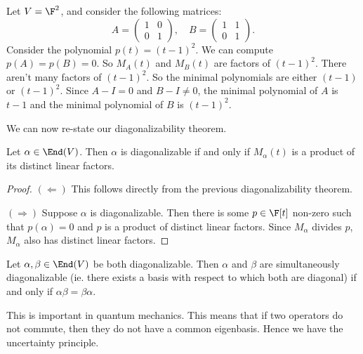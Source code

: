 \documentclass[a4paper]{article}
\begin{document}
\begin{eg}
  Let $V = \F^2$, and consider the following matrices:
  \[
    A =
    \begin{pmatrix}
      1 & 0\\
      0 & 1
    \end{pmatrix},\quad
    B =
    \begin{pmatrix}
      1 & 1\\
      0 & 1
    \end{pmatrix}.
  \]
  Consider the polynomial $p(t) = (t - 1)^2$. We can compute $p(A) = p(B) = 0$. So $M_A(t)$ and $M_B(t)$ are factors of $(t - 1)^2$. There aren't many factors of $(t - 1)^2$. So the minimal polynomials are either $(t - 1)$ or $(t - 1)^2$. Since $A - I = 0$ and $B - I \not= 0$, the minimal polynomial of $A$ is $t - 1$ and the minimal polynomial of $B$ is $(t - 1)^2$.
\end{eg}

We can now re-state our diagonalizability theorem.
\begin{thm}
  Let $\alpha \in \End(V)$. Then $\alpha$ is diagonalizable if and only if $M_\alpha(t)$ is a product of its distinct linear factors.
\end{thm}

\begin{proof}
  $(\Leftarrow)$ This follows directly from the previous diagonalizability theorem.

  $(\Rightarrow)$ Suppose $\alpha$ is diagonalizable. Then there is some $p\in \F[t]$ non-zero such that $p(\alpha) = 0$ and $p$ is a product of distinct linear factors. Since $M_\alpha$ divides $p$, $M_\alpha$ also has distinct linear factors.
\end{proof}

\begin{thm}
  Let $\alpha, \beta \in \End(V)$ be both diagonalizable. Then $\alpha$ and $\beta$ are simultaneously diagonalizable (ie. there exists a basis with respect to which both are diagonal) if and only if $\alpha\beta = \beta\alpha$.
\end{thm}
This is important in quantum mechanics. This means that if two operators do not commute, then they do not have a common eigenbasis. Hence we have the uncertainty principle.
\end{document}
